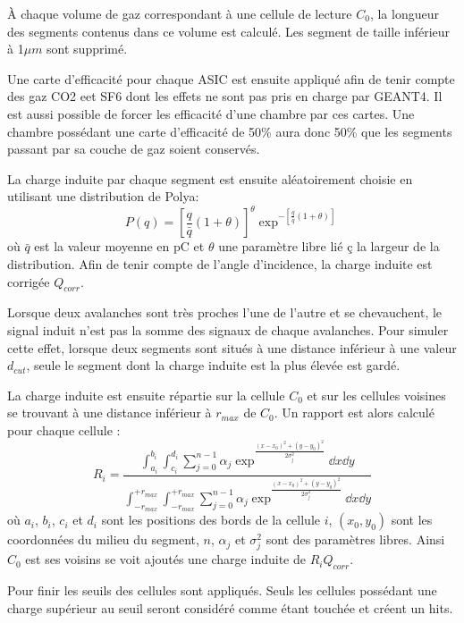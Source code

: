  À chaque volume de gaz correspondant à une cellule de lecture $C_{0}$, la longueur des segments contenus dans ce volume est calculé. Les segment de taille inférieur à 1$\mu m$ sont supprimé.
 
 Une carte d'efficacité pour chaque ASIC est ensuite appliqué afin de tenir compte des gaz CO2 eet SF6 dont les effets ne sont pas pris en charge par GEANT4. Il est aussi possible de forcer les efficacité d'une chambre par ces cartes. Une chambre possédant une carte d'efficacité de 50\% aura donc 50\% que les segments passant par sa couche de gaz soient conservés.
 
 La charge induite par chaque segment est ensuite aléatoirement choisie en utilisant une distribution de Polya:
 \begin{equation}
 P(q)=\left[\frac{q}{\bar{q}}(1+\theta)\right]^\theta\exp^{-\left[\frac{q}{\bar{q}}(1+\theta)\right]}
 \end{equation}
 où $\bar{q}$ est la valeur moyenne en pC et $\theta$ une paramètre libre lié ç la largeur de la distribution. Afin de tenir compte de l'angle d'incidence, la charge induite est corrigée $Q_{corr}$.
 
 Lorsque deux avalanches sont très proches l'une de l'autre et se chevauchent, le signal induit n'est pas la somme des signaux de chaque avalanches. Pour simuler cette effet, lorsque deux segments sont situés à une distance inférieur à une valeur $d_{cut}$, seule le segment dont la charge induite est la plus élevée est gardé.
 
 La charge induite est ensuite répartie sur la cellule $C_0$ et sur les cellules voisines se trouvant à une distance inférieur à $r_{max}$ de $C_0$. Un rapport est alors calculé pour chaque cellule :
 \begin{equation}
 R_i=\frac{\int_{a_i}^{b_i}\int_{c_i}^{d_i}\sum_{j=0}^{n-1}\alpha_j\exp^{\frac{(x-x_0)^2+(y-y_0)^2}{2\sigma_j^2}}\dd x\dd y}{\int_{-r_{max}}^{+r_{max}}\int_{-r_{max}}^{+r_{max}}\sum_{j=0}^{n-1}\alpha_j\exp^{\frac{(x-x_0)^2+(y-y_0)^2}{2\sigma_j^2}}\dd x\dd y}
 \end{equation}
où $a_i$, $b_i$, $c_i$ et $d_i$ sont les positions des bords de la cellule $i$, $(x_0,y_0)$ sont les coordonnées du milieu du segment, $n$, $\alpha_j$ et $\sigma_j^2$ sont des paramètres libres. Ainsi $C_0$ est ses voisins se voit ajoutés une charge induite de $R_iQ_{corr}$.

Pour finir les seuils des cellules sont appliqués. Seuls les cellules possédant une charge supérieur au seuil seront considéré comme étant touchée et créent un hits.

